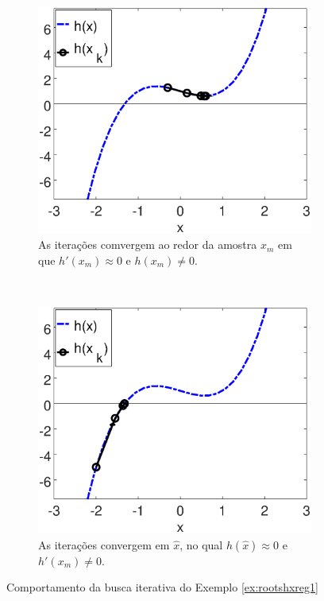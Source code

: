 \begin{figure}[!h]
    \centering
    \begin{subfigure}[b]{0.49\textwidth}
        \includegraphics[width=\textwidth]{chapters/roots/mfiles/hx_a/minimizando_hx_a_1.eps}
        \caption{As iterações comvergem ao redor da amostra $x_m$ em que $h'(x_m)\approx 0$ e $h(x_m)\neq 0$.}
        \label{fig:rootsRcasesa}
    \end{subfigure}
    ~ %
    \begin{subfigure}[b]{0.49\textwidth}
        \includegraphics[width=\textwidth]{chapters/roots/mfiles/hx_a/minimizando_hx_a_2.eps}
        \caption{As iterações convergem em $\hat{x}$, no qual $h(\hat{x})\approx 0$ e $h'(x_m)\neq 0$.}
        \label{fig:rootsRcasesb}
    \end{subfigure}
    \caption{Comportamento da busca iterativa do Exemplo \ref{ex:rootshxreg1}}
    \label{fig:rootsRcases}
\end{figure}

